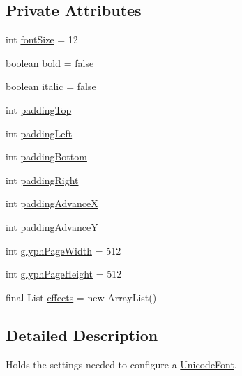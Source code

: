 \subsection*{Private Attributes}
\begin{DoxyCompactItemize}
\item 
int \mbox{\hyperlink{classorg_1_1newdawn_1_1slick_1_1font_1_1_hiero_settings_a3e39f423902a5895bd26921a14fe1044}{font\+Size}} = 12
\item 
boolean \mbox{\hyperlink{classorg_1_1newdawn_1_1slick_1_1font_1_1_hiero_settings_a836242ef5a8edc24a2b5b8c85f9160eb}{bold}} = false
\item 
boolean \mbox{\hyperlink{classorg_1_1newdawn_1_1slick_1_1font_1_1_hiero_settings_a4e55c90c505a6a53fa3684288d379e6a}{italic}} = false
\item 
int \mbox{\hyperlink{classorg_1_1newdawn_1_1slick_1_1font_1_1_hiero_settings_ad0793e48192b48898df4f3a31d4b3954}{padding\+Top}}
\item 
int \mbox{\hyperlink{classorg_1_1newdawn_1_1slick_1_1font_1_1_hiero_settings_ae145770ffd7fbe5fb0bc1e54be252734}{padding\+Left}}
\item 
int \mbox{\hyperlink{classorg_1_1newdawn_1_1slick_1_1font_1_1_hiero_settings_a4ae9e95c341789431f72c0d7ad54b348}{padding\+Bottom}}
\item 
int \mbox{\hyperlink{classorg_1_1newdawn_1_1slick_1_1font_1_1_hiero_settings_aca6e7bc5fddecfc1fe6fc94e864f05bc}{padding\+Right}}
\item 
int \mbox{\hyperlink{classorg_1_1newdawn_1_1slick_1_1font_1_1_hiero_settings_a95bbfc376e37c8cbddb33d7e2fed2dd4}{padding\+AdvanceX}}
\item 
int \mbox{\hyperlink{classorg_1_1newdawn_1_1slick_1_1font_1_1_hiero_settings_a9ebcbca5bb87465cbb18bbc40b1bb09e}{padding\+AdvanceY}}
\item 
int \mbox{\hyperlink{classorg_1_1newdawn_1_1slick_1_1font_1_1_hiero_settings_aeed4e1a4668cfa3c3dc94d481f68a5c3}{glyph\+Page\+Width}} = 512
\item 
int \mbox{\hyperlink{classorg_1_1newdawn_1_1slick_1_1font_1_1_hiero_settings_a17c4e911610ef26561713830e4998cc1}{glyph\+Page\+Height}} = 512
\item 
final List \mbox{\hyperlink{classorg_1_1newdawn_1_1slick_1_1font_1_1_hiero_settings_ad1134cfcc8c0f5d582f8abe54d7eeb80}{effects}} = new Array\+List()
\end{DoxyCompactItemize}


\subsection{Detailed Description}
Holds the settings needed to configure a \mbox{\hyperlink{classorg_1_1newdawn_1_1slick_1_1_unicode_font}{Unicode\+Font}}.

